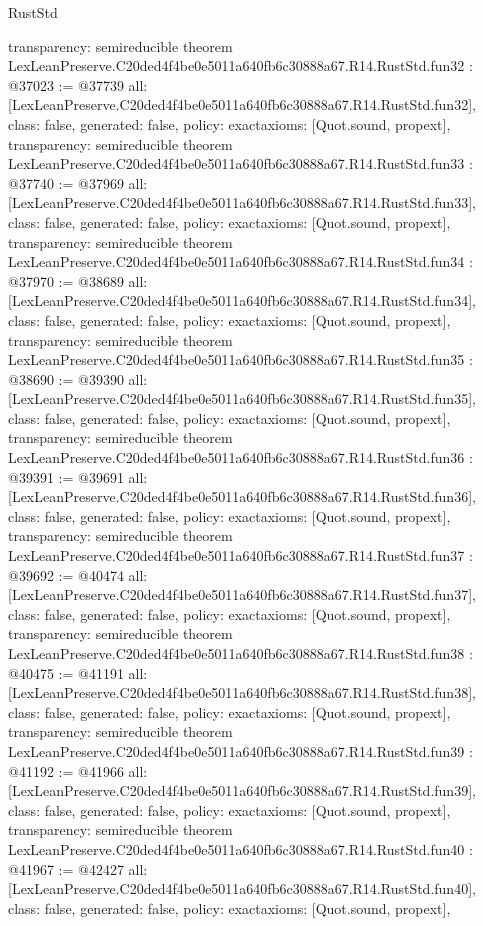 \begin{lexlean}{RustStd}
\begin{coremodule}
{  transparency: semireducible
}
theorem LexLeanPreserve.C20ded4f4be0e5011a640fb6c30888a67.R14.RustStd.fun32 : @37023 := @37739 {
  all: [LexLeanPreserve.C20ded4f4be0e5011a640fb6c30888a67.R14.RustStd.fun32],
  class: false,
  generated: false,
  policy: exact{axioms: [Quot.sound, propext]},
  transparency: semireducible
}
theorem LexLeanPreserve.C20ded4f4be0e5011a640fb6c30888a67.R14.RustStd.fun33 : @37740 := @37969 {
  all: [LexLeanPreserve.C20ded4f4be0e5011a640fb6c30888a67.R14.RustStd.fun33],
  class: false,
  generated: false,
  policy: exact{axioms: [Quot.sound, propext]},
  transparency: semireducible
}
theorem LexLeanPreserve.C20ded4f4be0e5011a640fb6c30888a67.R14.RustStd.fun34 : @37970 := @38689 {
  all: [LexLeanPreserve.C20ded4f4be0e5011a640fb6c30888a67.R14.RustStd.fun34],
  class: false,
  generated: false,
  policy: exact{axioms: [Quot.sound, propext]},
  transparency: semireducible
}
theorem LexLeanPreserve.C20ded4f4be0e5011a640fb6c30888a67.R14.RustStd.fun35 : @38690 := @39390 {
  all: [LexLeanPreserve.C20ded4f4be0e5011a640fb6c30888a67.R14.RustStd.fun35],
  class: false,
  generated: false,
  policy: exact{axioms: [Quot.sound, propext]},
  transparency: semireducible
}
theorem LexLeanPreserve.C20ded4f4be0e5011a640fb6c30888a67.R14.RustStd.fun36 : @39391 := @39691 {
  all: [LexLeanPreserve.C20ded4f4be0e5011a640fb6c30888a67.R14.RustStd.fun36],
  class: false,
  generated: false,
  policy: exact{axioms: [Quot.sound, propext]},
  transparency: semireducible
}
theorem LexLeanPreserve.C20ded4f4be0e5011a640fb6c30888a67.R14.RustStd.fun37 : @39692 := @40474 {
  all: [LexLeanPreserve.C20ded4f4be0e5011a640fb6c30888a67.R14.RustStd.fun37],
  class: false,
  generated: false,
  policy: exact{axioms: [Quot.sound, propext]},
  transparency: semireducible
}
theorem LexLeanPreserve.C20ded4f4be0e5011a640fb6c30888a67.R14.RustStd.fun38 : @40475 := @41191 {
  all: [LexLeanPreserve.C20ded4f4be0e5011a640fb6c30888a67.R14.RustStd.fun38],
  class: false,
  generated: false,
  policy: exact{axioms: [Quot.sound, propext]},
  transparency: semireducible
}
theorem LexLeanPreserve.C20ded4f4be0e5011a640fb6c30888a67.R14.RustStd.fun39 : @41192 := @41966 {
  all: [LexLeanPreserve.C20ded4f4be0e5011a640fb6c30888a67.R14.RustStd.fun39],
  class: false,
  generated: false,
  policy: exact{axioms: [Quot.sound, propext]},
  transparency: semireducible
}
theorem LexLeanPreserve.C20ded4f4be0e5011a640fb6c30888a67.R14.RustStd.fun40 : @41967 := @42427 {
  all: [LexLeanPreserve.C20ded4f4be0e5011a640fb6c30888a67.R14.RustStd.fun40],
  class: false,
  generated: false,
  policy: exact{axioms: [Quot.sound, propext]},
}
\end{coremodule}
\end{lexlean}
